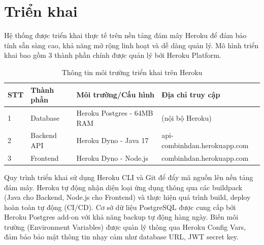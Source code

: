 \documentclass[../20232006p.tex]{subfiles}
\begin{document}
\section{Triển khai}

Hệ thống được triển khai thực tế trên nền tảng đám mây Heroku để đảm bảo tính sẵn sàng cao, khả năng mở rộng linh hoạt và dễ dàng quản lý. Mô hình triển khai bao gồm 3 thành phần chính được quản lý bởi Heroku Platform.

\begin{table}[H]
    \centering
    \caption{Thông tin môi trường triển khai trên Heroku}
    \label{tab:deployment_info}
    \begin{tabular}{|p{0.8cm}|p{2.5cm}|p{4.5cm}|p{5.5cm}|}
        \hline
        \textbf{STT} & \textbf{Thành phần} & \textbf{Môi trường/Cấu hình} & \textbf{Địa chỉ truy cập}    \\
        \hline
        1            & Database            & Heroku Postgres - 64MB RAM   & (nội bộ Heroku)              \\
        \hline
        2            & Backend API         & Heroku Dyno - Java 17        & api-combinhdan.herokuapp.com \\
        \hline
        3            & Frontend            & Heroku Dyno - Node.js        & combinhdan.herokuapp.com     \\
        \hline
    \end{tabular}
\end{table}


Quy trình triển khai sử dụng Heroku CLI và Git để đẩy mã nguồn lên nền tảng đám mây. Heroku tự động nhận diện loại ứng dụng thông qua các buildpack (Java cho Backend, Node.js cho Frontend) và thực hiện quá trình build, deploy hoàn toàn tự động (CI/CD). Cơ sở dữ liệu PostgreSQL được cung cấp bởi Heroku Postgres add-on với khả năng backup tự động hàng ngày. Biến môi trường (Environment Variables) được quản lý thông qua Heroku Config Vars, đảm bảo bảo mật thông tin nhạy cảm như database URL, JWT secret key.
\end{document}
